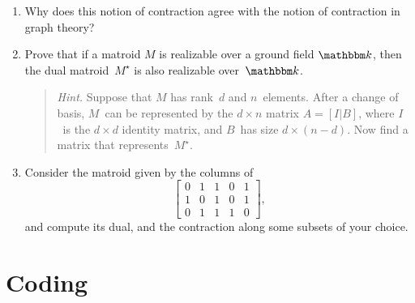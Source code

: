 \documentclass[11pt]{amsart}
\begin{document}
\bigskip
\begin{enumerate}
\item Why does this notion of contraction agree with the notion of contraction in graph theory?

  \bigskip
\item Prove that if a matroid $M$ is realizable over a ground field $\mathbbm k$, then the dual matroid~$M^\star$ is also realizable over~$\mathbbm k$.

  \medskip
  \begin{quote}\small
  \emph{Hint.} Suppose that $M$ has rank~$d$ and $n$~elements.
  After a change of basis, $M$~can be represented by the $d\times n$ matrix $A=[I|B]$, where $I$~is the $d\times d$ identity matrix, and $B$~has size $d\times(n-d)$.
  Now find a matrix that represents~$M^\star$.
\end{quote}

\bigskip
\item
  Consider the matroid given by the columns of
  \[
    \begin{bmatrix}
      0 & 1 & 1 & 0 & 1 \\
      1 & 0 & 1 & 0 & 1 \\
      0 & 1 & 1 & 1 & 0
    \end{bmatrix},
  \]
  and compute its dual, and the contraction along some subsets of your choice.
\end{enumerate}

\bigskip

\section*{Coding}
\end{document}
